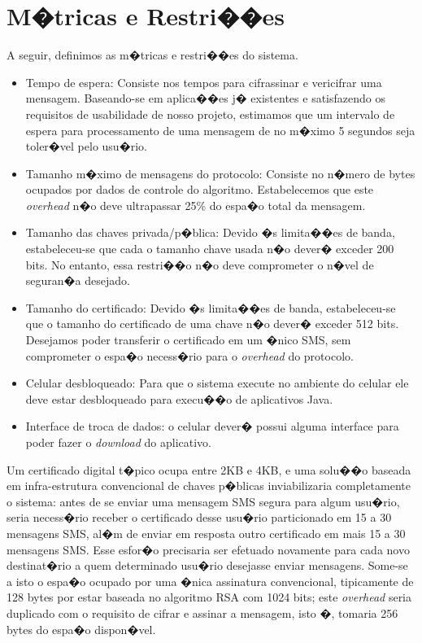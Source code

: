 \documentclass[a4paper,capchap,espacoduplo,normaltoc]{abntepusp}
\begin{document}
\section{M�tricas e Restri��es}

A seguir, definimos as m�tricas e restri��es do sistema. %

\begin{itemize}

\item Tempo de espera: Consiste nos tempos para cifrassinar e vericifrar uma mensagem. Baseando-se em aplica��es j� existentes e satisfazendo os requisitos de usabilidade de nosso projeto, estimamos que um intervalo de espera para processamento de uma mensagem de no m�ximo 5 segundos seja toler�vel pelo usu�rio.

\item Tamanho m�ximo de mensagens do protocolo: Consiste no n�mero de bytes ocupados por dados de controle do algoritmo. Estabelecemos que este \emph{overhead} n�o deve ultrapassar 25\% do espa�o total da mensagem.

\item Tamanho das chaves privada/p�blica: Devido �s limita��es de banda, estabeleceu-se que cada o tamanho chave usada n�o dever� exceder 200 bits. No entanto, essa restri��o n�o deve comprometer o n�vel de seguran�a desejado.

\item Tamanho do certificado: Devido �s limita��es de banda, estabeleceu-se que o tamanho do certificado de uma chave n�o dever� exceder 512 bits. Desejamos poder transferir o certificado em um �nico SMS, sem comprometer o espa�o necess�rio para o \emph{overhead} do protocolo.

\item Celular desbloqueado: Para que o sistema execute no ambiente do celular ele deve estar desbloqueado para execu��o de aplicativos Java.

\item Interface de troca de dados: o celular dever� possui alguma interface para poder fazer o \emph{download} do aplicativo.


\end{itemize}


Um certificado digital t�pico ocupa entre 2KB e 4KB, e uma solu��o baseada em infra-estrutura convencional de chaves p�blicas inviabilizaria completamente o sistema: antes de se enviar uma mensagem SMS segura para algum usu�rio, seria necess�rio receber o certificado desse usu�rio particionado em 15 a 30 mensagens SMS, al�m de enviar em resposta outro certificado em mais 15 a 30 mensagens SMS. Esse esfor�o precisaria ser efetuado novamente para cada novo destinat�rio a quem determinado usu�rio desejasse enviar mensagens. Some-se a isto o espa�o ocupado por uma �nica assinatura convencional, tipicamente de 128 bytes por estar baseada no algoritmo RSA com 1024 bits; este \emph{overhead} seria duplicado com o requisito de cifrar e assinar a mensagem, isto �, tomaria 256 bytes do espa�o dispon�vel. 
\end{document}
